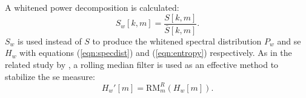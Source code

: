 {%


A whitened power decomposition is calculated:
\begin{equation}
\label{eqn:whitened_scalogram}
    S_w[k,m] = \frac{S[k,m]}{\bar{S}[k, m]}.
\end{equation}
$S_w$ is used instead of $S$ to produce the whitened spectral distribution $P_w$ and \ac{se} $H_w$ with equations (\ref{eqn:specdist}) and (\ref{eqn:entropy}) respectively. As in the related study by \citet{mypaper}, a rolling median filter is used as an effective method to stabilize the \ac{se} measure:
\begin{equation}
    H_w'[m] = \text{RM}_m^{R} (H_w[m]).
\end{equation}




}
